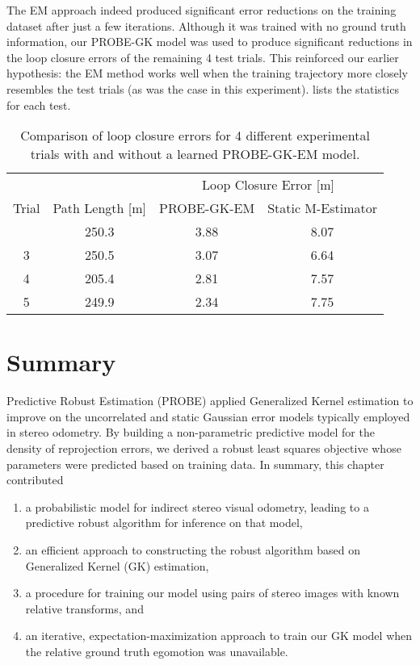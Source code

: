 The EM approach indeed produced significant error reductions on the training dataset after just a few iterations.  Although  it was trained with no ground truth information, our PROBE-GK model was used to produce significant reductions in the loop closure errors of the remaining 4 test trials. This reinforced our earlier hypothesis: the EM method works well when the training trajectory more closely resembles the test trials (as was the case in this experiment).  lists the statistics for each test. 


\begin{table}
\centering
\caption{Comparison of loop closure errors for 4 different experimental trials
  with and without a learned PROBE-GK-EM model.}
\begin{tabular}{ c  c  c  c }
     & & \multicolumn{2}{c}{Loop Closure Error [m]}  \\ \cline{3-4} \T
    Trial & Path Length [m] & PROBE-GK-EM & Static M-Estimator \\    
      \hline \T	
  2 & 250.3 & 3.88 & 8.07 \\
  3 & 250.5 & 3.07 & 6.64 \\
  4 & 205.4 & 2.81 & 7.57 \\
  5 & 249.9 & 2.34 & 7.75 \\ \hline
\end{tabular}
\label{table:probe-gk_loop_closure_errors}
\end{table}


\section{Summary}

Predictive Robust Estimation (PROBE) applied Generalized Kernel estimation to improve on the uncorrelated and static Gaussian error models typically employed in stereo odometry. By building a non-parametric predictive model for the density of reprojection errors, we derived a robust least squares objective whose parameters were predicted based on training data. In summary, this chapter contributed
\begin{enumerate}
\item a probabilistic model for indirect stereo visual odometry, leading to a predictive robust algorithm for inference on that model,
\item an efficient approach to constructing the robust algorithm based on Generalized Kernel (GK) estimation,
\item a procedure for training our model using pairs of stereo images with known relative transforms, and
\item an iterative, expectation-maximization approach to train our GK model when the relative ground truth egomotion was unavailable.
\end{enumerate}

